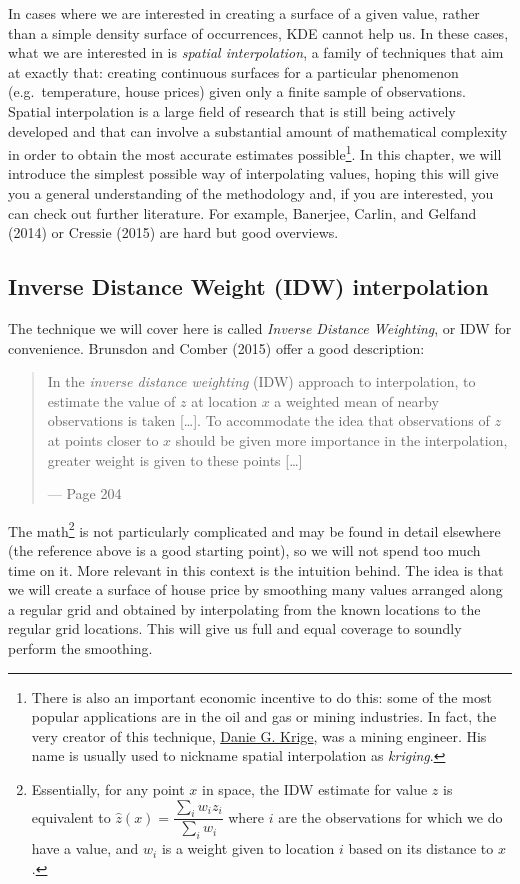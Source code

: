 \documentclass[
  letterpaper,
  DIV=11,
  numbers=noendperiod,
  oneside]{scrreprt}
\begin{document}
In cases where we are interested in creating a surface of a given value,
rather than a simple density surface of occurrences, KDE cannot help us.
In these cases, what we are interested in is \emph{spatial
interpolation}, a family of techniques that aim at exactly that:
creating continuous surfaces for a particular phenomenon
(e.g.~temperature, house prices) given only a finite sample of
observations. Spatial interpolation is a large field of research that is
still being actively developed and that can involve a substantial amount
of mathematical complexity in order to obtain the most accurate
estimates possible\footnote{There is also an important economic
  incentive to do this: some of the most popular applications are in the
  oil and gas or mining industries. In fact, the very creator of this
  technique, \href{https://en.wikipedia.org/wiki/Danie_G._Krige}{Danie
  G. Krige}, was a mining engineer. His name is usually used to nickname
  spatial interpolation as \emph{kriging}.}. In this chapter, we will
introduce the simplest possible way of interpolating values, hoping this
will give you a general understanding of the methodology and, if you are
interested, you can check out further literature. For example, Banerjee,
Carlin, and Gelfand (2014) or Cressie (2015) are hard but good
overviews.

\subsection{Inverse Distance Weight (IDW)
interpolation}\label{inverse-distance-weight-idw-interpolation}

The technique we will cover here is called \emph{Inverse Distance
Weighting}, or IDW for convenience. Brunsdon and Comber (2015) offer a
good description:

\begin{quote}
In the \emph{inverse distance weighting} (IDW) approach to
interpolation, to estimate the value of \(z\) at location \(x\) a
weighted mean of nearby observations is taken {[}\ldots{]}. To
accommodate the idea that observations of \(z\) at points closer to
\(x\) should be given more importance in the interpolation, greater
weight is given to these points {[}\ldots{]}

--- Page 204
\end{quote}

The math\footnote{Essentially, for any point \(x\) in space, the IDW
  estimate for value \(z\) is equivalent to
  \(\hat{z} (x) = \dfrac{\sum_i w_i z_i}{\sum_i w_i}\) where \(i\) are
  the observations for which we do have a value, and \(w_i\) is a weight
  given to location \(i\) based on its distance to \(x\).} is not
particularly complicated and may be found in detail elsewhere (the
reference above is a good starting point), so we will not spend too much
time on it. More relevant in this context is the intuition behind. The
idea is that we will create a surface of house price by smoothing many
values arranged along a regular grid and obtained by interpolating from
the known locations to the regular grid locations. This will give us
full and equal coverage to soundly perform the smoothing.
\end{document}
